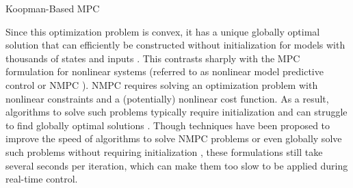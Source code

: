 \begin{algorithm}[t]
\SetAlgoLined
{}
 \caption{Koopman-Based MPC}
 \label{alg:mpc}
\end{algorithm}



Since this optimization problem is convex, it has a unique globally optimal solution that can efficiently be constructed without initialization \cite{boyd2004convex} for models with thousands of states and inputs  \cite{paulson2014fast,stellato2018osqp}.
This contrasts sharply with the MPC formulation for nonlinear systems (referred to as nonlinear model predictive control or NMPC \cite{allgower2012nonlinear}).
NMPC requires solving an optimization problem with nonlinear constraints and a (potentially) nonlinear cost function.
As a result, algorithms to solve such problems typically require initialization and can struggle to find globally optimal solutions \cite{polak2012optimization}.
Though techniques have been proposed to improve the speed of algorithms to solve NMPC problems \cite{patterson2014gpops,hereid2017frost} or even globally solve such problems without requiring initialization \cite{zhao2017control}, these formulations still take several seconds per iteration, which can make them too slow to be applied during real-time control.


